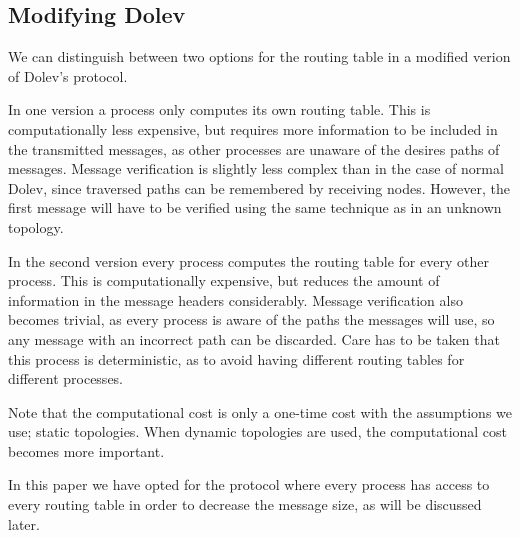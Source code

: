 \subsection{Modifying Dolev}
\label{contr:modifying-dolev}

We can distinguish between two options for the routing table in a modified verion of Dolev's protocol.

In one version a process only computes its own routing table. This is computationally less expensive, but requires more information to be included in the transmitted messages, as other processes are unaware of the desires paths of messages. Message verification is slightly less complex than in the case of normal Dolev, since traversed paths can be remembered by receiving nodes. However, the first message will have to be verified using the same technique as in an unknown topology. 

In the second version every process computes the routing table for every other process. This is computationally expensive, but reduces the amount of information in the message headers considerably. Message verification also becomes trivial, as every process is aware of the paths the messages will use, so any message with an incorrect path can be discarded. Care has to be taken that this process is deterministic, as to avoid having different routing tables for different processes.

Note that the computational cost is only a one-time cost with the assumptions we use; static topologies. When dynamic topologies are used, the computational cost becomes more important. 

In this paper we have opted for the protocol where every process has access to every routing table in order to decrease the message size, as will be discussed later.



